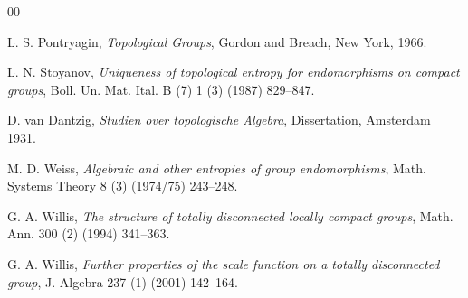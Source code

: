 \documentclass[11pt]{article}
\theoremstyle{definition}
\numberwithin{equation}{section}
\begin{document}
\begin{thebibliography}{00}
{%

 L. S. Pontryagin, \emph{Topological Groups}, Gordon and Breach, New York, 1966.


         
 L. N. Stoyanov, \emph{Uniqueness of topological entropy for endomorphisms on compact groups}, Boll. Un. Mat. Ital. B (7) 1 (3) (1987) 829--847.

 D. van Dantzig, \emph{Studien over topologische Algebra}, Dissertation, Amsterdam 1931.





  M. D. Weiss, \emph{Algebraic and other entropies of group endomorphisms}, Math. Systems Theory 8 (3) (1974/75) 243--248.

 G. A. Willis, \emph{The structure of totally disconnected locally compact groups}, Math. Ann. 300 (2) (1994) 341--363. 


 G. A. Willis, \emph{Further properties of the scale function on a totally disconnected group}, J. Algebra 237 (1) (2001) 142--164. 


}
\end{thebibliography}
\end{document}
